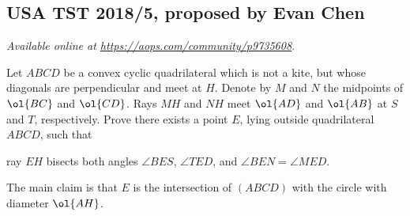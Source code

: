 \documentclass[11pt]{scrartcl}
\begin{document}
\subsection{USA TST 2018/5, proposed by Evan Chen}
\textsl{Available online at \url{https://aops.com/community/p9735608}.}
\begin{mdframed}[style=mdpurplebox,frametitle={Problem statement}]
Let $ABCD$ be a convex cyclic quadrilateral which is not a kite,
but whose diagonals are perpendicular and meet at $H$.
Denote by $M$ and $N$ the midpoints of $\ol{BC}$ and $\ol{CD}$.
Rays $MH$ and $NH$ meet $\ol{AD}$ and $\ol{AB}$ at $S$ and $T$, respectively.
Prove there exists a point $E$, lying outside quadrilateral $ABCD$,
such that
\begin{itemize}
  \ii ray $EH$ bisects both angles $\angle BES$, $\angle TED$, and
  \ii $\angle BEN = \angle MED$.
\end{itemize}
\end{mdframed}
The main claim is that $E$ is the
intersection of $(ABCD)$ with the circle with diameter $\ol{AH}$.
\end{document}
